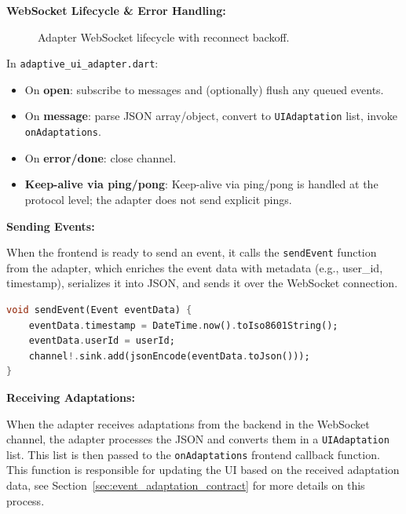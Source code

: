 \textbf{WebSocket Lifecycle \& Error Handling:}
\begin{figure}[H]
\centering
{}
\caption{Adapter WebSocket lifecycle with reconnect backoff.}
\end{figure}

\noindent In \texttt{adaptive\_ui\_adapter.dart}:
\begin{itemize}
  \item On \textbf{open}: subscribe to messages and (optionally) flush any queued events.
  \item On \textbf{message}: parse JSON array/object, convert to \texttt{UIAdaptation} list, invoke \texttt{onAdaptations}.
  \item On \textbf{error/done}: close channel.
  \item \textbf{Keep-alive via ping/pong}: Keep-alive via ping/pong is handled at the protocol level; the adapter does not send explicit pings.
\end{itemize}

\textbf{Sending Events:}

When the frontend is ready to send an event, it calls the \texttt{sendEvent} function from the adapter, which enriches the event data with metadata (e.g., user\_id, timestamp), serializes it into JSON, and sends it over the WebSocket connection. 

\begin{lstlisting}[language=Dart,basicstyle=\ttfamily\small,caption={sendEvent: serialize and send over WS}]
void sendEvent(Event eventData) {
    eventData.timestamp = DateTime.now().toIso8601String();
    eventData.userId = userId;
    channel!.sink.add(jsonEncode(eventData.toJson()));
}
\end{lstlisting}

\textbf{Receiving Adaptations:}

When the adapter receives adaptations from the backend in the WebSocket channel, the adapter processes the JSON and converts them in a \texttt{UIAdaptation} list. This list is then passed to the \texttt{onAdaptations} frontend callback function. This function is responsible for updating the UI based on the received adaptation data, see Section~\ref{sec:event_adaptation_contract} for more details on this process.

